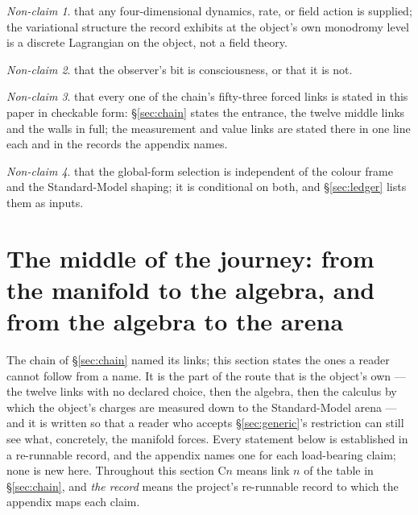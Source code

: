 \documentclass[11pt,a4paper]{article}
\theoremstyle{definition}
\theoremstyle{remark}
\newtheorem{nonclaim}{Non-claim}
\begin{document}
\begin{nonclaim} that any four-dimensional dynamics, rate, or field action is supplied; the variational structure the record exhibits at the object's own monodromy level is a discrete Lagrangian on the object, not a field theory. \end{nonclaim}
\begin{nonclaim} that the observer's bit is consciousness, or that it is not. \end{nonclaim}
\begin{nonclaim} that every one of the chain's fifty-three forced links is stated in this paper in checkable form: \S\ref{sec:chain}
states the entrance, the twelve middle links and the walls in full; the measurement and value links are stated there in one
line each and in the records the appendix names. \end{nonclaim}
\begin{nonclaim} that the global-form selection is independent of the colour frame and the Standard-Model shaping; it is
conditional on both, and \S\ref{sec:ledger} lists them as inputs. \end{nonclaim}

\section{The middle of the journey: from the manifold to the algebra, and from the algebra to the arena}\label{sec:middle}

The chain of \S\ref{sec:chain} named its links; this section states the ones a reader cannot follow from a name. It is
the part of the route that is the object's own --- the twelve links with no declared choice, then the algebra, then the
calculus by which the object's charges are measured down to the Standard-Model arena --- and it is written so that a reader
who accepts \S\ref{sec:generic}'s restriction can still see what, concretely, the manifold forces. Every statement below is
established in a re-runnable record, and the appendix names one for each load-bearing claim; none is new here. Throughout this
section C$n$ means link $n$ of the table in \S\ref{sec:chain}, and \emph{the record} means the project's re-runnable record to
which the appendix maps each claim.
\end{document}
